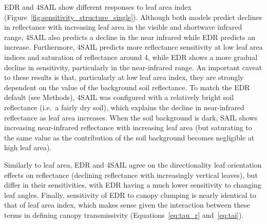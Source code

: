 

EDR and 4SAIL show different responses to leaf area index (Figure~\ref{fig:sensitivity_structure_single}).
Although both models predict declines in reflectance with increasing leaf area in the visible and shortwave infrared range,
4SAIL also predicts a decline in the near infrared while EDR predicts an increase.
Furthermore, 4SAIL predicts more reflectance sensitivity at low leaf area indices and saturation of reflectance around 4, while EDR shows a more gradual decline in sensitivity, particularly in the near-infrared range. 
An important caveat to these results is that, particularly at low leaf area index, they are strongly dependent on the value of the background soil reflectance.
To match the EDR default (see Methods), 4SAIL was configured with a relatively bright soil reflectance (i.e.\ a fairly dry soil), which explains the decline in near-infrared reflectance as leaf area increases.
When the soil background is dark, SAIL shows increasing near-infrared reflectance with increasing leaf area (but saturating to the same value as the contribution of the soil background becomes negligible at high leaf area).

Similarly to leaf area, EDR and 4SAIL agree on the directionality leaf orientation effects on reflectance (declining reflectance with increasingly vertical leaves), but differ in their sensitivities, with EDR having a much lower sensitivity to changing leaf angles.
Finally, sensitivity of EDR to canopy clumping is nearly identical to that of leaf area index, which makes sense given the interaction between these terms in defining canopy transmissivity (Equations~\ref{eq:tau_r} and~\ref{eq:tai}).


